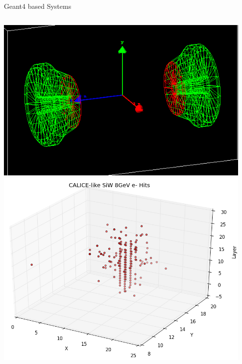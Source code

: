 \documentclass[pdf, 9pt]{beamer}
\begin{document}
  \begin{frame}{Geant4 based Systems}
    \begin{columns}[T]
      \begin{column}{0.33\textwidth}
        \includegraphics[width=0.99\textwidth, height=0.3\textheight]{figs/siw/SHE_70_20.png}\\ \vspace{0.3cm}
        \includegraphics[width=0.99\textwidth, height=0.4\textheight]{figs/scatter_3d/scatter_3D_8GeV.png}
      \end{column}
      \begin{column}{0.33\textwidth}

\end{column}
\end{columns}
\end{frame}
\end{document}
